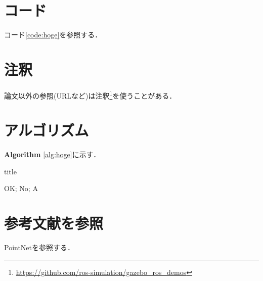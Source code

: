 \documentclass[a4paper,10pt]{jsarticle}
\begin{document}
\section{コード}
コード\ref{code:hoge}を参照する．


\section{注釈}
論文以外の参照(URLなど)は注釈\footnote{\url{https://github.com/ros-simulation/gazebo_ros_demos}}を使うことがある．



\section{アルゴリズム}
{\bf{Algorithm}} \ref{alg:hoge}に示す．

\begin{algorithm*}[H]
    \small{
        \caption{title}
        \label{alg:hoge}
        {
            {
                OK;
            }
            \Else
            {
                No;
            }
        }
        \Return A
    }
\end{algorithm*}

\section{参考文献を参照}
PointNet\cite{point_net}を参照する．



\end{document}
